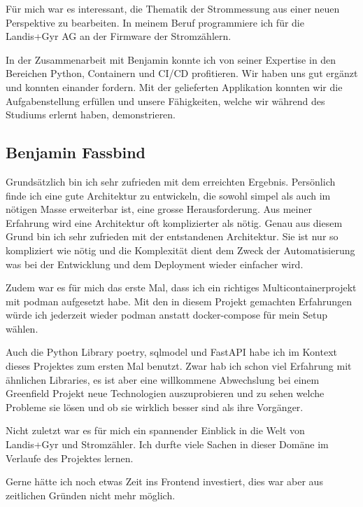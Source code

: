 Für mich war es interessant, die Thematik der Strommessung aus einer neuen Perspektive zu bearbeiten.
In meinem Beruf programmiere ich für die Landis+Gyr AG an der Firmware der Stromzählern.

In der Zusammenarbeit mit Benjamin konnte ich von seiner Expertise in den Bereichen Python, Containern und CI/CD profitieren.
Wir haben uns gut ergänzt und konnten einander fordern.
Mit der gelieferten Applikation konnten wir die Aufgabenstellung erfüllen 
und unsere Fähigkeiten, welche wir während des Studiums erlernt haben, demonstrieren.

\subsection{Benjamin Fassbind}

Grundsätzlich bin ich sehr zufrieden mit dem erreichten Ergebnis.
Persönlich finde ich eine gute Architektur zu entwickeln, die sowohl simpel
als auch im nötigen Masse erweiterbar ist, eine grosse Herausforderung.
Aus meiner Erfahrung wird eine Architektur oft komplizierter als nötig.
Genau aus diesem Grund bin ich sehr zufrieden mit der entstandenen Architektur.
Sie ist nur so kompliziert wie nötig und die Komplexität dient dem Zweck
der Automatisierung was bei der Entwicklung und dem Deployment wieder einfacher wird.

Zudem war es für mich das erste Mal, dass ich ein richtiges Multicontainerprojekt
mit podman aufgesetzt habe. Mit den in diesem Projekt gemachten Erfahrungen
würde ich jederzeit wieder podman anstatt docker-compose für mein Setup wählen.

Auch die Python Library poetry, sqlmodel und FastAPI habe ich im Kontext dieses
Projektes zum ersten Mal benutzt. Zwar hab ich schon viel Erfahrung mit
ähnlichen Libraries, es ist aber eine willkommene Abwechslung bei einem
Greenfield Projekt neue Technologien auszuprobieren und zu sehen welche Probleme sie lösen
und ob sie wirklich besser sind als ihre Vorgänger.

Nicht zuletzt war es für mich ein spannender Einblick in die Welt von Landis+Gyr
und Stromzähler. Ich durfte viele Sachen in dieser Domäne im Verlaufe des Projektes lernen.

Gerne hätte ich noch etwas Zeit ins Frontend investiert, dies war aber aus zeitlichen Gründen
nicht mehr möglich.